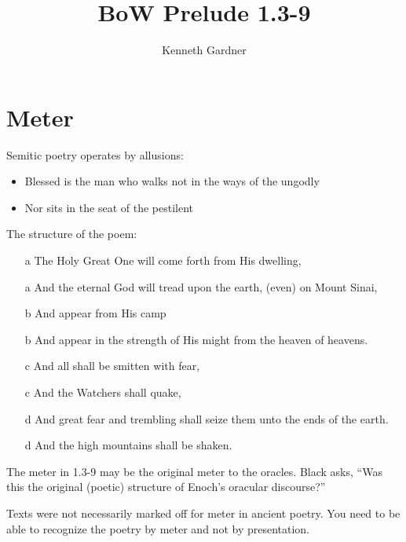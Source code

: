\documentclass{beamer}
\title{BoW Prelude 1.3-9}
\author{Kenneth Gardner}
\begin{document}
\maketitle

\section{Meter}

\begin{frame}
  Semitic poetry operates by allusions:\pause
  \begin{itemize}
	\item Blessed is the man who walks not in the ways of the ungodly
	\item Nor sits in the seat of the pestilent
  \end{itemize}
\end{frame}

\begin{frame}
  The structure of the poem:
  \begin{itemize}
	\item[a] The Holy Great One will come forth from His dwelling,
	\item[a] And the eternal God will tread upon the earth, (even) on Mount Sinai,
	\item[b] And appear from His camp
	\item[b] And appear in the strength of His might from the heaven of heavens.
	\item[c] And all shall be smitten with fear,
	\item[c] And the Watchers shall quake,
	\item[d] And great fear and trembling shall seize them unto the ends of the earth.
	\item[d] And the high mountains shall be shaken.
  \end{itemize}
\end{frame}

\begin{frame}
  The meter in 1.3-9 may be the original meter to the oracles.
  Black asks, ``Was this the original (poetic) structure of Enoch's oracular discourse?''
\end{frame}

\begin{frame}
  Texts were not necessarily marked off for meter in ancient poetry.
  You need to be able to recognize the poetry by meter and not by presentation.
\end{frame}
\end{document}
